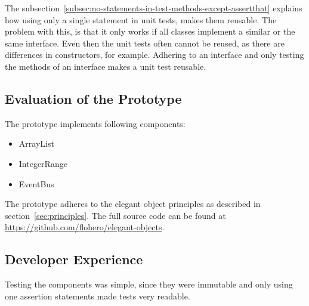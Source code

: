 The subsection\ \ref{subsec:no-statements-in-test-methods-except-assertthat} explains how using only a single statement in unit tests, makes them reusable.
The problem with this, is that it only works if all classes implement a similar or the same interface.
Even then the unit tests often cannot be reused, as there are differences in constructors, for example.
Adhering to an interface and only testing the methods of an interface makes a unit test reusable.

\subsection{Evaluation of the Prototype}\label{subsec:evaluation-of-the-prototype}
The prototype implements following components:
\begin{itemize}
    \item ArrayList
    \item IntegerRange
    \item EventBus
\end{itemize}
The prototype adheres to the elegant object principles as described in section\ \ref{sec:principles}.
The full source code can be found at \url{https://github.com/flohero/elegant-objects}.

\subsection{Developer Experience}\label{subsec:developer-experience}
Testing the components was simple, since they were immutable and only using one assertion statements made tests very readable.